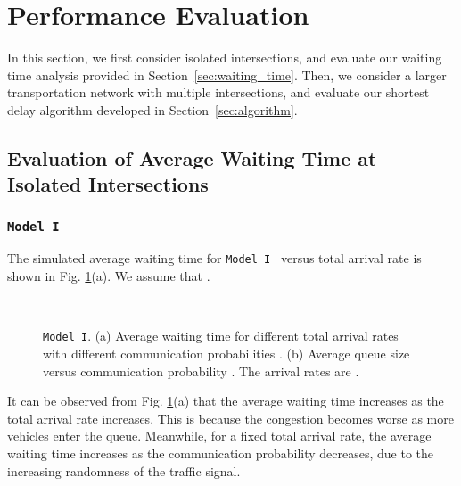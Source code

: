 \documentclass[conference]{IEEEtran}
\newcommand{\modelI}{{\tt{Model I}}}
\begin{document}
\vspace{-5pt}
\section{Performance Evaluation}\label{sec:sims}
In this section, we first consider isolated intersections, and evaluate our waiting time analysis provided in Section~\ref{sec:waiting_time}. Then, we consider a larger transportation network with multiple intersections, and evaluate our shortest delay algorithm developed in Section~\ref{sec:algorithm}.

\vspace{-5pt}
\subsection{Evaluation of Average Waiting Time at Isolated Intersections}

\subsubsection{\modelI}
The simulated average waiting time for \modelI~ versus total arrival rate is shown in Fig. \ref{fig:sims_one_queue_modelI}(a). We assume that .


\begin{figure}[t!]
\vspace{-10pt}
\begin{center}
 \\
\end{center}
\begin{center}
\vspace{-5pt}
\caption{\label{fig:sims_one_queue_modelI} \modelI. (a) Average waiting time for different total arrival rates with different communication probabilities . (b) Average queue size versus communication probability . The arrival rates are .}
\vspace{-25pt}
\end{center}
\end{figure}




It can be observed from Fig. \ref{fig:sims_one_queue_modelI}(a) that the average waiting time increases as the total arrival rate increases. This is because the congestion becomes worse as more vehicles enter the queue. Meanwhile, for a fixed total arrival rate, the average waiting time increases as the communication probability  decreases, due to the increasing randomness of the traffic signal.
\end{document}
